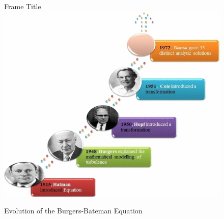 \documentclass{article}
\begin{document}
\begin{flushleft}
    \begin{figure}[h]
        \centering
            \begin{frame}{Frame Title}
                \includegraphics[scale=0.5]{Image.png}
            \end{frame}
        \caption{Evolution of the Burgers-Bateman Equation}
        \label{Evolution}
    \end{figure}
    
    
\end{flushleft}



\end{document}

